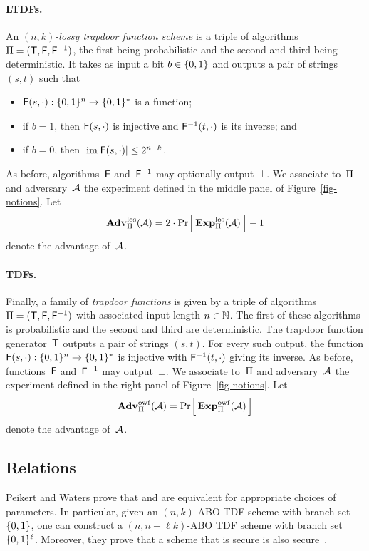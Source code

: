 \documentclass{llncs}
\begin{document}
\paragraph{LTDFs.}
An \emph{$(n,k)$-lossy trapdoor function scheme} is a triple of algorithms
$\mathrm{\Pi} = (\mathsf{T}, \mathsf{F}, \mathsf{F}^{-1})$, the first being probabilistic and the
second and third being deterministic.
%
It takes as input a bit $b \in \{0,1\}$ and outputs a pair of strings $(s,t)$ such
that
\begin{itemize}
  \item $\mathsf{F}(s, \cdot) : \{0,1\}^n \to \{0,1\}^*$ is a function;
  \item if $b = 1$, then $\mathsf{F}(s, \cdot)$ is injective and $\mathsf{F}^{-1}(t,
    \cdot)$ is its inverse; and
  \item if $b = 0$, then $|\mathrm{im}\; \mathsf{F}(s, \cdot)| \leq 2^{n-k}$.
\end{itemize}
%
As before, algorithms~$\mathsf{F}$ and~$\mathsf{F}^{-1}$ may optionally output~$\bot$.
%
We associate to~$\mathrm{\Pi}$ and adversary~$\mathcal{A}$ the experiment \los defined
in the middle panel of Figure~\ref{fig-notions}. Let
\[
  \Adv{\los}_{\tdfscheme}(\advA) = 2\cdot
  \prob{\Exp{\los}_{\tdfscheme}(\advA)} - 1
\]
denote the advantage of~$\mathcal{A}$.

\paragraph{TDFs.}
%
Finally, a family of \emph{trapdoor functions} is given by a  triple of
algorithms $\mathrm{\Pi} = (\mathsf{T}, \mathsf{F}, \mathsf{F}^{-1})$ with associated input
length $n\in\mathbb{N}$. The first of these algorithms is probabilistic and the second
and third are deterministic.
%
The trapdoor function generator~$\mathsf{T}$ outputs a pair of strings $(s,t)$. For
every such output, the function $\mathsf{F}(s,\cdot) : \{0,1\}^n \to \{0,1\}^*$ is
injective with $\mathsf{F}^{-1}(t,\cdot)$ giving its inverse.
%
As before, functions~$\mathsf{F}$ and~$\mathsf{F}^{-1}$ may output~$\bot$.
%
We associate to~$\mathrm{\Pi}$ and adversary~$\mathcal{A}$ the experiment \owf defined in
the right panel of Figure~\ref{fig-notions}. Let
\[
  \Adv{\owf}_{\tdfscheme}(\advA) = \prob{\Exp{\owf}_{\tdfscheme}(\advA)}
\]
denote the advantage of~$\mathcal{A}$.

\subsection{Relations}
Peikert and Waters prove that \abo and \los are equivalent for appropriate
choices of parameters. In particular, given an $(n,k)$-ABO TDF scheme with branch
set $\{0,1\}$, one can construct a $(n,n-\ell k)$-ABO TDF scheme with branch set
$\{0,1\}^\ell$.
%
Moreover, they prove that a scheme that is \los secure is also \owf
secure~\cite[Lemma 3.1]{pw08}.
%
\end{document}
